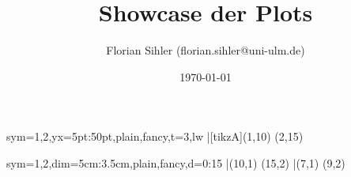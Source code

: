 \documentclass{article}
\title{Showcase der Plots}
\author{Florian Sihler (florian.sihler@uni-ulm.de)}
\date{\today}
\begin{document}
\maketitle


\begin{ybar}[*]{sym={1,2},yx=5pt:50pt,plain,fancy,t=3,lw}
    \bar[tikzA]{(1,10) (2,15)}
\end{ybar}


\begin{xbar*}{sym={1,2},dim=5cm:3.5cm,plain,fancy,d=0:15}
    \bar{(10,1) (15,2)}
    \bar{(7,1) (9,2)}
\end{xbar*}
\end{document}
